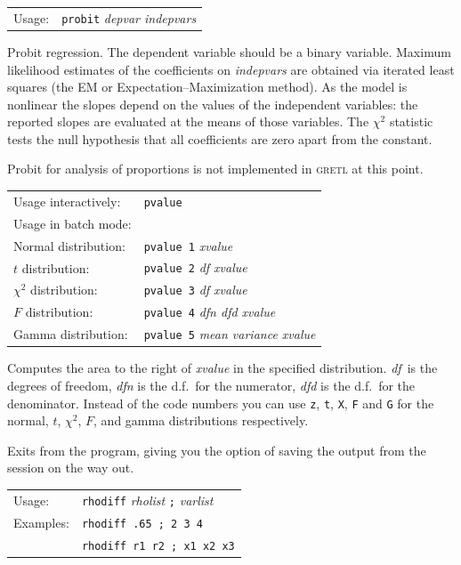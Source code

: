 \documentclass{article}
\begin{document}
{

\begin{tabular}{ll}
Usage:   &    \texttt{probit} \textit{depvar indepvars}
\end{tabular}

Probit regression. The dependent variable should be a binary variable.
Maximum likelihood estimates of the coefficients on \textit{indepvars}
are obtained via iterated least squares (the EM or
Expectation--Maximization method).  As the model is nonlinear the
slopes depend on the values of the independent variables: the reported
slopes are evaluated at the means of those variables.  The $\chi^2$
statistic tests the null hypothesis that all coefficients are zero
apart from the constant.

Probit for analysis of proportions is not implemented in
\textsc{gretl} at this point.


\begin{tabular}{ll}
Usage interactively: & \texttt{pvalue} \\
Usage in batch mode: & \\
\quad Normal distribution: & \texttt{pvalue 1} \textit{xvalue}\\
\quad $t$ distribution: & \texttt{pvalue 2} \textit{df xvalue}\\
\quad $\chi^2$ distribution: & \texttt{pvalue 3} \textit{df xvalue}\\
\quad $F$ distribution: & \texttt{pvalue 4} \textit{dfn dfd xvalue}\\
\quad Gamma distribution: & \texttt{pvalue 5} \textit{mean variance xvalue}
\end{tabular}     

Computes the area to the right of \textit{xvalue} in the specified
distribution.  \textit{df}\ is the degrees of freedom, \textit{dfn} is
the d.f.\ for the numerator, \textit{dfd} is the d.f.\ for the
denominator.  Instead of the code numbers you can use \texttt{z},
\texttt{t}, \texttt{X}, \texttt{F} and \texttt{G} for the normal, $t$,
$\chi^2$, $F$, and gamma distributions respectively.


Exits from the program, giving you the option of saving the output
from the session on the way out.  


\begin{tabular}{ll}
Usage:   &     \texttt{rhodiff} \textit{rholist} \texttt{;} \textit{varlist}\\
Examples: &     \texttt{rhodiff .65 ; 2 3 4}\\
          &     \texttt{rhodiff r1 r2 ; x1 x2 x3}
\end{tabular}

}
\end{document}
